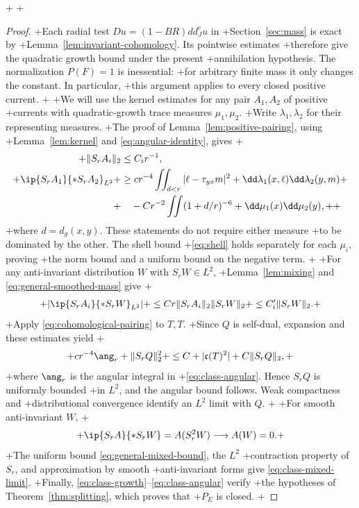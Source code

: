 +
+\begin{proof}
+Each radial test \(Du=(1-BR)dd_J^cu\) in
+Section~\ref{sec:mass} is exact by
+Lemma~\ref{lem:invariant-cohomology}. Its pointwise estimates
+therefore give the quadratic growth bound under the present
+annihilation hypothesis. The normalization \(P(F)=1\) is inessential:
+for arbitrary finite mass it only changes the constant. In particular,
+this argument applies to every closed positive current.
+
+We will use the kernel estimates for any pair \(A_1,A_2\) of positive
+currents with quadratic-growth trace measures \(\mu_1,\mu_2\).
+Write \(\lambda_1,\lambda_2\) for their representing measures.
+The proof of Lemma~\ref{lem:positive-pairing}, using
+Lemma~\ref{lem:kernel} and \eqref{eq:angular-identity}, gives
+\begin{align}
+ \|S_rA_i\|_2&\le C_i r^{-1},\label{eq:general-smoothed-mass}\\
+ \ip{S_rA_1}{*S_rA_2}_{L^2}
+ &\ge cr^{-4}\iint_{d<r}|\ell-\tau_{yx}m|^2
+            \dd\lambda_1(x,\ell)\dd\lambda_2(y,m)
+ \nonumber\\
+ &\quad-Cr^{-2}\iint(1+d/r)^{-6}
+                     \dd\mu_1(x)\dd\mu_2(y),
+ \label{eq:general-positive-pairing}
+\end{align}
+where \(d=d_g(x,y)\). These statements do not require either measure
+to be dominated by the other. The shell bound
+\eqref{eq:shell} holds separately for each \(\mu_i\), proving
+the norm bound and a uniform bound on the negative term.
+
+For any anti-invariant distribution \(W\) with \(S_rW\in L^2\),
+Lemma~\ref{lem:mixing} and \eqref{eq:general-smoothed-mass} give
+\begin{equation}\label{eq:general-mixed-bound}
+ |\ip{S_rA_i}{*S_rW}_{L^2}|
+ \le Cr\|S_rA_i\|_2\|S_rW\|_2
+ \le C_i'\|S_rW\|_2.
+\end{equation}
+Apply \eqref{eq:cohomological-pairing} to \(T,T\).
+Since \(Q\) is self-dual, expansion and these estimates yield
+\[
+ cr^{-4}\ang_r+\|S_rQ\|_2^2
+ \le C+|\mathfrak c(T)^2|+C\|S_rQ\|_2,
+\]
+where \(\ang_r\) is the angular integral in
+\eqref{eq:class-angular}. Hence \(S_rQ\) is uniformly bounded
+in \(L^2\), and the angular bound follows. Weak compactness and
+distributional convergence identify an \(L^2\) limit with \(Q\).
+
+For smooth anti-invariant \(W\),
+\[
+ \ip{S_rA}{*S_rW}=A(S_r^2W)\longrightarrow A(W)=0.
+\]
+The uniform bound \eqref{eq:general-mixed-bound}, the \(L^2\)
+contraction property of \(S_r\), and approximation by smooth
+anti-invariant forms give \eqref{eq:class-mixed-limit}.
+Finally, \eqref{eq:class-growth}--\eqref{eq:class-angular} verify
+the hypotheses of Theorem~\ref{thm:splitting}, which proves that
+\(P_E\) is closed.
+\end{proof}
